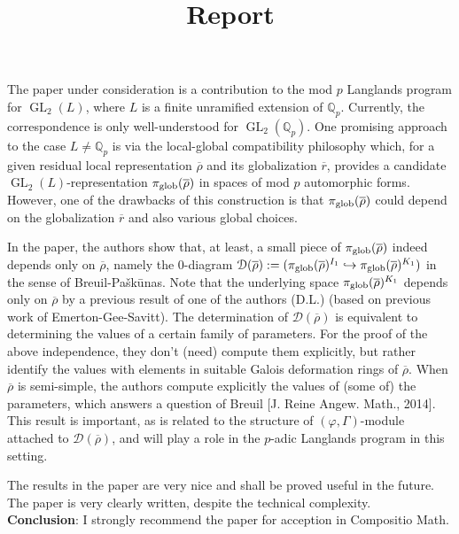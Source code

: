 \documentclass{amsart}
\title[]{ \large {\rm Report}    }
\date{}
\newcommand{\Q}{\mathbb Q}
\DeclareMathOperator{\GL}{\mathrm GL}
\theoremstyle{definition}
\newcommand{\vv}{\vspace{2mm}}
\begin{document}
\maketitle
 
 
 

 

The paper under consideration is a contribution to the mod $p$ Langlands program for $\GL_2(L)$, where $L$ is a finite unramified extension of $\Q_p$. Currently, the correspondence is only well-understood for $\GL_2(\Q_p)$. One promising approach to the case $L\neq \Q_p$  is via the  local-global compatibility philosophy which, for  a given residual local representation $\overline{\rho}$ and its globalization $\overline{r}$,  provides a candidate $\GL_2(L)$-representation $\pi_{\rm glob}(\overline{\rho})$ in  spaces of mod $p$   automorphic forms.  However, one of the drawbacks of this construction is that $\pi_{\rm glob}(\overline{\rho})$ could depend on the globalization $\overline{r}$ and also various global choices.
\vv

In the paper, the authors show that, at least, a small piece of $\pi_{\rm glob}(\overline{\rho})$   indeed depends only on $\overline{\rho}$, namely the $0$-diagram $\mathcal{D}(\overline{\rho}):=(\pi_{\rm glob}(\overline{\rho})^{I_1}\hookrightarrow \pi_{\rm glob}(\overline{\rho})^{K_1})$ in the sense of Breuil-Pa\v{s}k\=unas. Note that the underlying space $\pi_{\rm glob}(\overline{\rho})^{K_1}$ depends only on $\overline{\rho}$ by a previous result of one of the authors (D.L.) (based on previous work of Emerton-Gee-Savitt). 
The determination of $\mathcal{D}(\overline{\rho})$ is equivalent to determining the values of a certain family of parameters. For the proof of the above independence, they don't (need) compute them explicitly, but rather  identify the values with elements in suitable Galois deformation rings of $\overline{\rho}$.   When  $\overline{\rho}$ is semi-simple, the authors compute explicitly  the values of (some of) the parameters, which    
answers a question of Breuil [J. Reine Angew. Math., 2014]. This result is important, as is related to the structure of $(\varphi,\Gamma)$-module attached to $\mathcal{D}(\overline{\rho})$, and will play a role in the  $p$-adic Langlands program in this setting. 
\vv

 The results in the paper are very nice and shall be proved useful in the future. The paper is very clearly written, despite the technical complexity.   \\
  \textbf{Conclusion}: I strongly recommend the paper for acception in Compositio Math. 
  \bigskip
\bigskip
\end{document}
